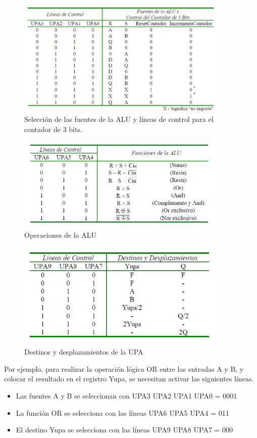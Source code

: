\documentclass[12pt]{book}
\theoremstyle{definition}
\theoremstyle{remark}
\theoremstyle{plain}
\begin{document}
\begin{figure}
\centering
\includegraphics[width=4in]{tabla1.jpg}
\caption{Selección de las fuentes de la ALU y líneas de control para el contador de 3 bits.}
\label{fig33}
\end{figure}


\begin{figure}
\centering
\includegraphics[width=4in]{tabla2.jpg}
\caption{Operaciones de la ALU}
\label{fig34}
\end{figure}

\begin{figure}
\centering
\includegraphics[width=4in]{tabla3.jpg}
\caption{Destinos y desplazamientos de la UPA}
\label{fig35}
\end{figure}

Por ejemplo, para realizar la operación lógica OR entre las entradas A y B, y colocar el resultado
en el registro Yupa, se necesitan activar las siguientes líneas.
\begin{itemize}
\item  Las fuentes A y B se seleccionan con UPA3 UPA2 UPA1 UPA0 = 0001
\item La función OR se selecciona con las líneas UPA6 UPA5 UPA4 = 011
\item El destino Yupa se selecciona con las líneas UPA9 UPA8 UPA7 = 000
\end{itemize}
\end{document}
